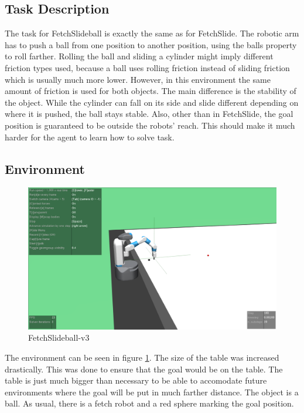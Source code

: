 \subsection{Task Description}

The task for FetchSlideball is exactly the same as for FetchSlide. The robotic arm has to push a ball from one position to another position, using the balls property to roll farther. Rolling the ball and sliding a cylinder might imply different friction types used, because a ball uses rolling friction instead of sliding friction which is usually much more lower. However, in this environment the same amount of friction is used for both objects. The main difference is the stability of the object. While the cylinder can fall on its side and slide different depending on where it is pushed, the ball stays stable. 
Also, other than in FetchSlide, the goal position is guaranteed to be outside the robots' reach. This should make it much harder for the agent to learn how to solve task.


\subsection{Environment}

\begin{figure} [!h]
	
	\centering
	\includegraphics[width=1\textwidth]{figures/FetchSlideball-v3.png}
	\caption{FetchSlideball-v3}
	\label{slideball1}
\end{figure}

The environment can be seen in figure \ref{slideball1}. The size of the table was increased drastically. This was done to ensure that the goal would be on the table. The table is just much bigger than necessary to be able to accomodate future environments where the goal will be put in much farther distance. The object is a ball. As usual, there is a fetch robot and a red sphere marking the goal position. 

